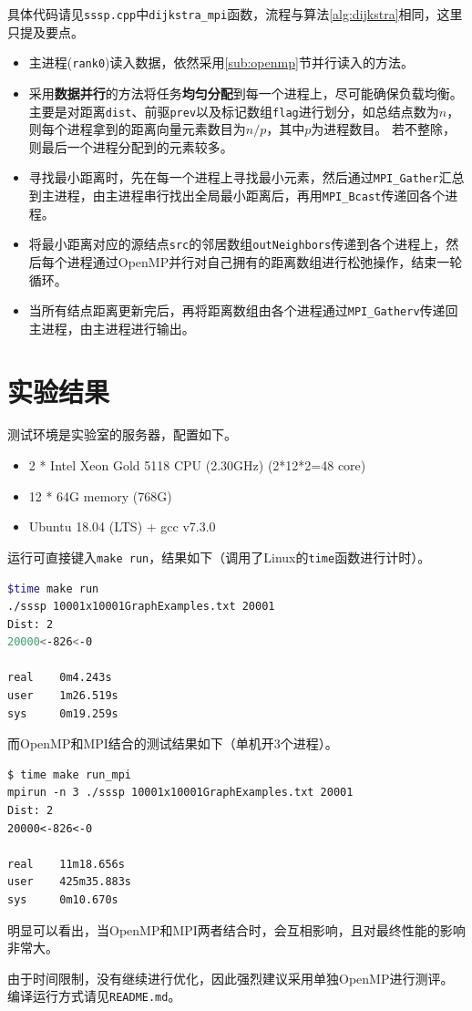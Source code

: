 \documentclass[reportComp]{thesis}
\begin{document}
具体代码请见\verb'sssp.cpp'中\verb'dijkstra_mpi'函数，流程与算法\ref{alg:dijkstra}相同，这里只提及要点。
\begin{itemize}
	\item 主进程(\verb'rank0')读入数据，依然采用\ref{sub:openmp}节并行读入的方法。
	\item 采用\textbf{数据并行}的方法将任务\textbf{均匀分配}到每一个进程上，尽可能确保负载均衡。
	主要是对距离\verb'dist'、前驱\verb'prev'以及标记数组\verb'flag'进行划分，如总结点数为$n$，则每个进程拿到的距离向量元素数目为$n/p$，其中$p$为进程数目。
	若不整除，则最后一个进程分配到的元素较多。
	\item 寻找最小距离时，先在每一个进程上寻找最小元素，然后通过\verb'MPI_Gather'汇总到主进程，由主进程串行找出全局最小距离后，再用\verb'MPI_Bcast'传递回各个进程。
	\item 将最小距离对应的源结点\verb'src'的邻居数组\verb'outNeighbors'传递到各个进程上，然后每个进程通过OpenMP并行对自己拥有的距离数组进行松弛操作，结束一轮循环。
	\item 当所有结点距离更新完后，再将距离数组由各个进程通过\verb'MPI_Gatherv'传递回主进程，由主进程进行输出。
\end{itemize}

\section{实验结果}
测试环境是实验室的服务器，配置如下。
\begin{itemize}
	\item 2 * Intel Xeon Gold 5118 CPU (2.30GHz) (2*12*2=48 core)
	\item 12 * 64G memory (768G)
	\item Ubuntu 18.04 (LTS) + gcc v7.3.0
\end{itemize}

运行可直接键入\verb'make run'，结果如下（调用了Linux的\verb'time'函数进行计时）。
\begin{lstlisting}[language=bash]
$time make run
./sssp 10001x10001GraphExamples.txt 20001
Dist: 2
20000<-826<-0

real    0m4.243s
user    1m26.519s
sys     0m19.259s
\end{lstlisting}

而OpenMP和MPI结合的测试结果如下（单机开3个进程）。
\begin{lstlisting}
$ time make run_mpi
mpirun -n 3 ./sssp 10001x10001GraphExamples.txt 20001
Dist: 2
20000<-826<-0

real    11m18.656s
user    425m35.883s
sys     0m10.670s
\end{lstlisting}

明显可以看出，当OpenMP和MPI两者结合时，会互相影响，且对最终性能的影响非常大。

由于时间限制，没有继续进行优化，因此强烈建议采用单独OpenMP进行测评。
编译运行方式请见\verb'README.md'。
\end{document}
